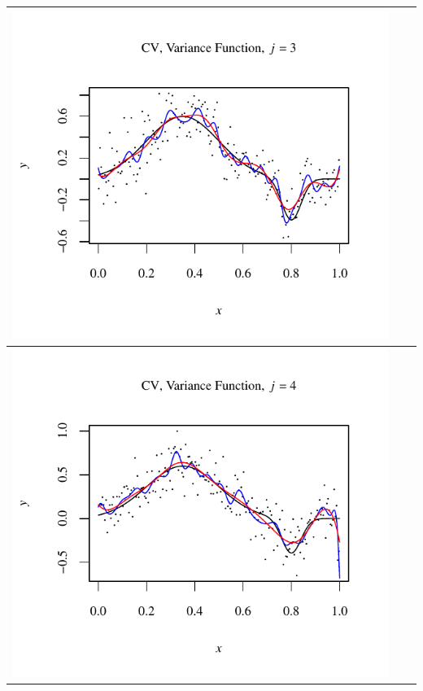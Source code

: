 \documentclass[11pt]{article}
\begin{document}
\begin{table}[h!]
\begin{center}
\begin{tabular}{| >{\centering\arraybackslash}m{2.1in} |  >{\centering\arraybackslash}m{2.1in} |  >{\centering\arraybackslash}m{2.1in}|}
      \includegraphics[width=1\linewidth,height=0.18\textheight]{Graphs/1/4/assignment5_a_1_4_3}\\\hline
      \includegraphics[width=1\linewidth,height=0.18\textheight]{Graphs/1/4/assignment5_a_1_4_4}&

\end{tabular}
\end{center}
\end{table}
\end{document}
